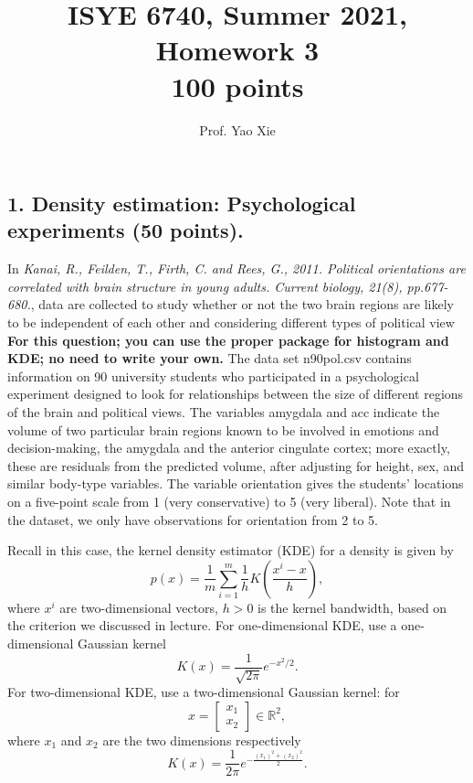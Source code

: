 \documentclass[12pt]{article}
\begin{document}
\title{ISYE 6740, Summer 2021, Homework 3\\{\small 100 points}}
\author{Prof. Yao Xie}
\date{}
\maketitle


\subsection*{1. Density estimation: Psychological experiments (50 points).}


In {\it Kanai, R., Feilden, T., Firth, C. and Rees, G., 2011. Political orientations are correlated with brain structure in young adults. Current biology, 21(8), pp.677-680.}, data are collected to  study whether or not the two brain regions are likely to be independent of each other and considering different types of political view \textbf{For this question; you can use the proper package for histogram and KDE; no need to write your own.} The data set \textsf{n90pol.csv} contains information on 90 university students who participated in a psychological experiment designed to look for relationships between the size of different regions of the brain and political views. The variables \textsf{amygdala} and \textsf{acc} indicate the volume of two particular brain regions known to be involved in emotions and decision-making, the amygdala and the anterior cingulate cortex; more exactly, these are residuals from the predicted volume, after adjusting for height, sex, and similar body-type variables. The variable \textsf{orientation} gives the students' locations on a five-point scale from 1 (very conservative) to 5 (very liberal).  Note that in the dataset, we only have observations for orientation from 2 to 5. 

Recall in this case, the kernel density estimator (KDE) for a density is given by
 \[
 p(x) = \frac 1 m \sum_{i=1}^m \frac 1 h
 K\left(
 \frac{x^i - x}{h}
 \right),
 \]
where $x^i$ are two-dimensional vectors, $h >0$ is the kernel bandwidth, based on the criterion we discussed in lecture. 
For one-dimensional KDE,  use a one-dimensional Gaussian kernel
\[
K(x) = \frac{1}{\sqrt{2\pi}} e^{-x^2/2}.
\]
For two-dimensional KDE, use a two-dimensional Gaussian kernel: for \[x = \begin{bmatrix}x_1\\x_2\end{bmatrix}\in \mathbb R^2,\] where $x_1$ and $x_2$ are the two dimensions respectively \[K(x) = \frac{1}{2\pi} e^{-\frac{(x_1)^2 + (x_2)^2}{2}}.\] 
  
\end{document}
